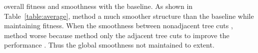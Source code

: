  overall fitness and smoothness  with the baseline.
As shown in Table~\ref{table:average},  method  a much smoother structure than the baseline while maintaining  fitness.
When the smoothness between non\kg{-}adjacent tree cuts ,  method  worse\kg{,}
because  method only  the adjacent tree cuts to improve the performance .
Thus\kg{,} the global smoothness  not maintained to  extent.


